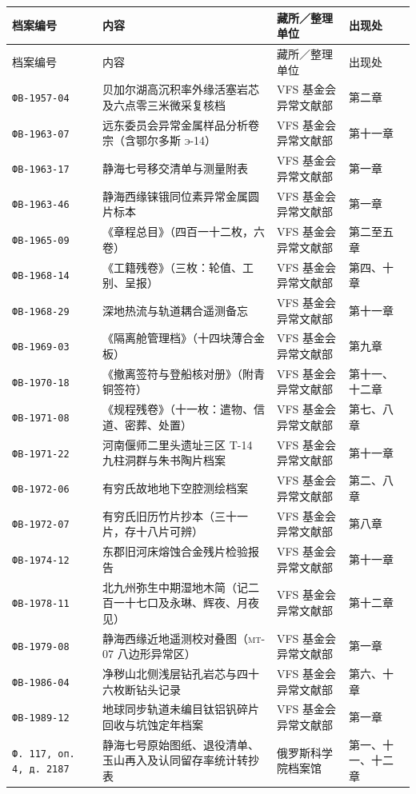 \vspace{2mm}
{\footnotesize\renewcommand{\arraystretch}{1.20}
\begin{longtable}{@{}p{34mm}p{52mm}p{36mm}p{12mm}@{}}
\toprule
档案编号 & 内容 & 藏所／整理单位 & 出现处 \\
\midrule
\endfirsthead
\toprule
档案编号 & 内容 & 藏所／整理单位 & 出现处 \\
\midrule
\endhead
\bottomrule
\endfoot
\texttt{ФВ-1957-04} & 贝加尔湖高沉积率外缘活塞岩芯及六点零三米微采复核档 & VFS 基金会异常文献部 & 第二章 \\
\texttt{ФВ-1963-07} & 远东委员会异常金属样品分析卷宗（含鄂尔多斯 \textsc{э}-14） & VFS 基金会异常文献部 & 第十一章 \\
\texttt{ФВ-1963-17} & 静海七号移交清单与测量附表 & VFS 基金会异常文献部 & 第一章 \\
\texttt{ФВ-1963-46} & 静海西缘铼锇同位素异常金属圆片标本 & VFS 基金会异常文献部 & 第一章 \\
\texttt{ФВ-1965-09} & 《章程总目》（四百一十二枚，六卷） & VFS 基金会异常文献部 & 第二至五章 \\
\texttt{ФВ-1968-14} & 《工籍残卷》（三枚：轮值、工别、呈报） & VFS 基金会异常文献部 & 第四、十章 \\
\texttt{ФВ-1968-29} & 深地热流与轨道耦合遥测备忘 & VFS 基金会异常文献部 & 第十一章 \\
\texttt{ФВ-1969-03} & 《隔离舱管理档》（十四块薄合金板） & VFS 基金会异常文献部 & 第九章 \\
\texttt{ФВ-1970-18} & 《撤离签符与登船核对册》（附青铜签符） & VFS 基金会异常文献部 & 第十一、十二章 \\
\texttt{ФВ-1971-08} & 《规程残卷》（十一枚：遣物、信道、密葬、处置） & VFS 基金会异常文献部 & 第七、八章 \\
\texttt{ФВ-1971-22} & 河南偃师二里头遗址三区 T-14 九柱洞群与朱书陶片档案 & VFS 基金会异常文献部 & 第十一章 \\
\texttt{ФВ-1972-06} & 有穷氏故地地下空腔测绘档案 & VFS 基金会异常文献部 & 第二、八章 \\
\texttt{ФВ-1972-07} & 有穷氏旧历竹片抄本（三十一片，存十八片可辨） & VFS 基金会异常文献部 & 第八章 \\
\texttt{ФВ-1974-12} & 东郡旧河床熔蚀合金残片检验报告 & VFS 基金会异常文献部 & 第十一章 \\
\texttt{ФВ-1978-11} & 北九州弥生中期湿地木简（记二百一十七口及永琳、辉夜、月夜见） & VFS 基金会异常文献部 & 第十二章 \\
\texttt{ФВ-1979-08} & 静海西缘近地遥测校对叠图（\textsc{mt}-07 八边形异常区） & VFS 基金会异常文献部 & 第一章 \\
\texttt{ФВ-1986-04} & 净秽山北侧浅层钻孔岩芯与四十六枚断钻头记录 & VFS 基金会异常文献部 & 第六、十章 \\
\texttt{ФВ-1989-12} & 地球同步轨道未编目钛铝钒碎片回收与坑蚀定年档案 & VFS 基金会异常文献部 & 第一章 \\
\texttt{Ф.\,117, оп.\,4, д.\,2187} & 静海七号原始图纸、退役清单、玉山再入及认同留存率统计转抄表 & 俄罗斯科学院档案馆 & 第一、十一、十二章 \\
\end{longtable}}

